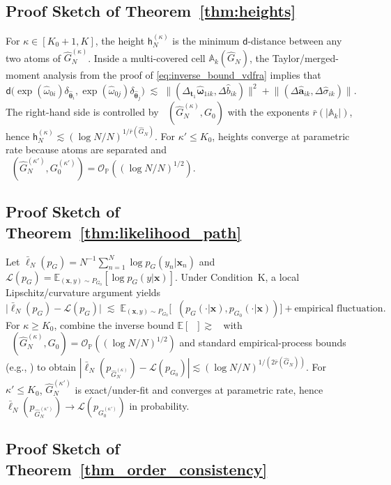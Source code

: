 \documentclass[twoside]{article}
\DeclareMathOperator*{\VDFRA}{D_{FRA}}
\DeclareMathOperator*{\VDE}{D_{E}}
\newcommand{\divclus}{\mathsf{d}}
\newcommand{\height}{\mathsf{h}}
\DeclareMathOperator*{\TV}{D_{TV}}
\theoremstyle{plain}
\theoremstyle{definition}
\theoremstyle{plain}
\def\rvx{{\mathbf{x}}}
\def\vtheta{{\bm{\theta}}}
\def\vomega{{\bm{\omega}}}
\def\va{{\bm{a}}}
\def\vt{{\bm{t}}}
\def\vx{{\bm{x}}}
\def\sA{{\mathbb{A}}}
\def\sP{{\mathbb{P}}}
\newcommand{\E}{\mathbb{E}}
\newcommand{\cL}{\mathcal{L}}
\newcommand{\cO}{\mathcal{O}}
\begin{document}
\subsection{Proof Sketch of Theorem~\ref{thm:heights}}

For \(\kappa\in[K_0+1,K]\), the height \(\height_N^{(\kappa)}\) is the minimum \(\divclus\)-distance between any two atoms of \(\widehat G_N^{(\kappa)}\).
Inside a multi-covered cell \(\sA_k(\widehat G_N)\), the Taylor/merged-moment analysis from the proof of \cref{eq:inverse_bound_vdfra} implies that
\[
\divclus\!\big(\exp(\widehat\omega_{0i})\delta_{\widehat\vtheta_i},
\exp(\widehat\omega_{0j})\delta_{\widehat\vtheta_j}\big)\;\lesssim\;
\big\|(\Delta_{\vt_1}\widehat\vomega_{1ik},\Delta \widehat b_{ik})\big\|^2
+\big\|(\Delta \widehat\va_{ik},\Delta \widehat\sigma_{ik})\big\|.
\]
The right-hand side is controlled by \(\VDFRA(\widehat G_N^{(\kappa)},G_0)\) with the exponents \(\bar r(|\sA_k|)\), hence
\(
\height_N^{(\kappa)}\lesssim (\log N/N)^{1/\bar r(\widehat G_N)}
\).
For \(\kappa'\le K_0\), heights converge at parametric rate because atoms are separated and \(\VDE(\widehat G_N^{(\kappa')},G_0^{(\kappa')})=\cO_\sP((\log N/N)^{1/2})\).

\subsection{Proof Sketch of Theorem~\ref{thm:likelihood_path}}

Let \(\bar\ell_N(p_G)=N^{-1}\sum_{n=1}^N\log p_G(y_n| \rvx_n)\) and \(\cL(p_G)=\E_{(\rvx,y)\sim P_{G_0}}[\log p_G(y| \vx)]\).
Under Condition~K, a local Lipschitz/curvature argument yields
\[
\big|\bar\ell_N(p_{G})-\cL(p_{G})\big|\;\lesssim\;
\E_{(\rvx,y)\sim P_{G_0}}\big[\TV(p_G(\cdot|\vx),p_{G_0}(\cdot|\vx))\big]
+\text{empirical fluctuation}.
\]
For \(\kappa\ge K_0\), combine the inverse bound
\(\E[\TV]\gtrsim \VDFRA\) with \(\VDFRA(\widehat G_N^{(\kappa)},G_0)=\cO_\sP((\log N/N)^{1/2})\) and standard empirical-process bounds (e.g., \citealp{van_de_geer_empirical_2000}) to obtain
\(
|\bar\ell_N(p_{\widehat G_N^{(\kappa)}})-\cL(p_{G_0})|\lesssim (\log N/N)^{1/(2\bar r(\widehat G_N))}
\).
For \(\kappa'\le K_0\), \(\widehat G_N^{(\kappa')}\) is exact/under-fit and converges at parametric rate, hence
\(\bar\ell_N(p_{\widehat G_N^{(\kappa')}})\to \cL(p_{G_0^{(\kappa')}})\) in probability.

\iffalse
\subsection{Proof Sketch of Theorem~\ref{thm_order_consistency}}
\end{document}
